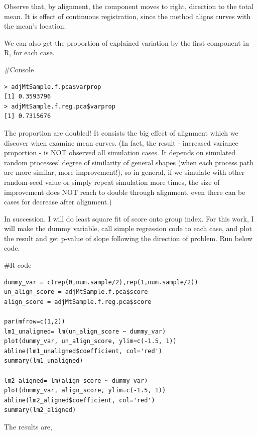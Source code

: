 \documentclass{article}
\newenvironment{Rcode}%
{%
    \begin{mdframed}
    \#R code
    \begin{small}
}
{%
    \end{small}
    \end{mdframed}
}
\newenvironment{console}%
{%
    \begin{mdframed}
    \#Console
    \begin{small}
}
{%
    \end{small}
    \end{mdframed}
}
\begin{document}
Observe that, by alignment, the component moves to right, direction to the total mean. It is effect of continuous registration,
since the method aligns curves with the mean's location.

We can also get the proportion of explained variation by the first component in R, for each case.
\begin{console}
    \begin{verbatim}
> adjMtSample.f.pca$varprop
[1] 0.3593796
> adjMtSample.f.reg.pca$varprop
[1] 0.7315676
    \end{verbatim}
\end{console}
The proportion are doubled! It consists the big effect of alignment which we discover when examine mean curves. 
(In fact, the result - increased variance proportion - is NOT observed all simulation cases. It depends on simulated
random processes' degree of similarity of general shapes (when each process path are more similar, more improvement!), 
so in general, if we simulate with other random-seed value or simply repeat simulation more times, the size of improvement does NOT reach
to double through alignment, even there can be cases for decrease after alignment.)

In succession, I will do least square fit of score onto group index. 
For this work, I will make the dummy variable, call simple regression code to each case,
and plot the result and get p-value of slope following the direction of problem.
Run below code.
\begin{Rcode}
    \begin{verbatim}
dummy_var = c(rep(0,num.sample/2),rep(1,num.sample/2))
un_align_score = adjMtSample.f.pca$score
align_score = adjMtSample.f.reg.pca$score

par(mfrow=c(1,2))
lm1_unaligned= lm(un_align_score ~ dummy_var)
plot(dummy_var, un_align_score, ylim=c(-1.5, 1))
abline(lm1_unaligned$coefficient, col='red')
summary(lm1_unaligned)

lm2_aligned= lm(align_score ~ dummy_var)
plot(dummy_var, align_score, ylim=c(-1.5, 1))
abline(lm2_aligned$coefficient, col='red')
summary(lm2_aligned)        
    \end{verbatim}
\end{Rcode}

The results are,
\end{document}

